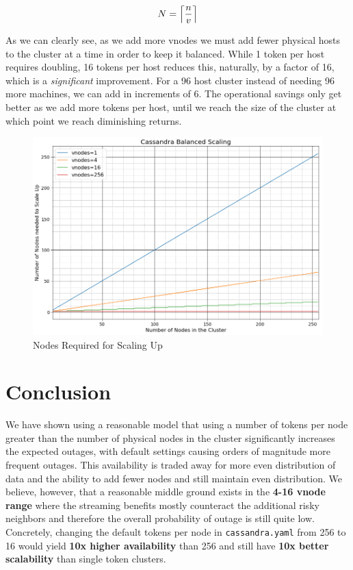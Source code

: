 \documentclass{article}
\DeclarePairedDelimiter{\ceil}{\lceil}{\rceil}
\begin{document}
\begin{equation} \label{eq:scaling}
    N = \ceil*{\frac{n}{v}}
\end{equation}

As we can clearly see, as we add more vnodes we must add fewer
physical hosts to the cluster at a time in order to keep it balanced. While 1
token per host requires doubling, 16 tokens per host reduces this, naturally,
by a factor of 16, which is a \textit{significant} improvement. For a 96 host
cluster instead of needing 96 more machines, we can add in increments of 6. The
operational savings only get better as we add more tokens per host, until we
reach the size of the cluster at which point we reach diminishing returns.

\begin{figure}[h!]
    \centering
    \includegraphics[width=1.0\textwidth]{images/scale_up.png}
    \caption{Nodes Required for Scaling Up}
    \label{fig:scaling}
\end{figure}

\section{Conclusion}

We have shown using a reasonable model that using a number of tokens per node
greater than the number of physical nodes in the cluster significantly increases
the expected outages, with default settings causing orders of magnitude more
frequent outages. This availability is traded away for more even distribution
of data and the ability to add fewer nodes and still maintain even distribution.
We believe, however, that a reasonable middle ground exists in the
\textbf{4-16 vnode range} where the streaming benefits mostly counteract the
additional risky neighbors and therefore the overall probability of outage is
still quite low. Concretely, changing the default tokens per node in
\texttt{cassandra.yaml} from 256 to 16 would yield \textbf{10x higher availability}
than 256 and still have \textbf{10x better scalability} than single token clusters.
\end{document}
